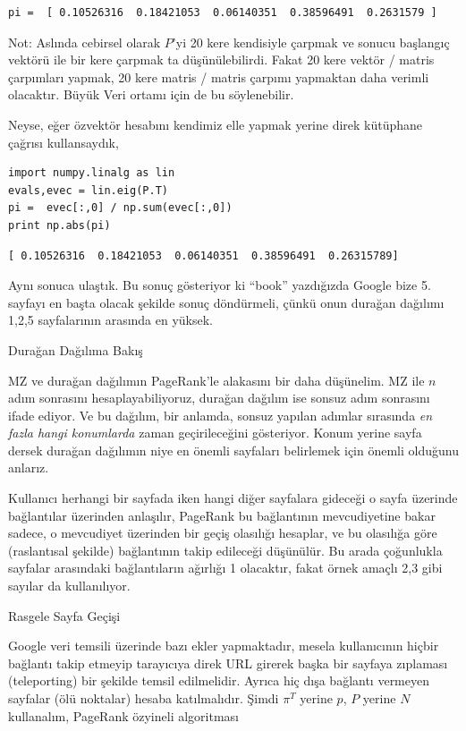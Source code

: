 \documentclass[12pt,fleqn]{article}\usepackage{../../common}
\begin{document}
\begin{verbatim}
pi =  [ 0.10526316  0.18421053  0.06140351  0.38596491  0.2631579 ]
\end{verbatim}

Not: Aslında cebirsel olarak $P$'yi 20 kere kendisiyle çarpmak ve sonucu
başlangıç vektörü ile bir kere çarpmak ta düşünülebilirdi. Fakat 20 kere
vektör / matris çarpımları yapmak, 20 kere matris / matris çarpımı
yapmaktan daha verimli olacaktır. Büyük Veri ortamı için de bu söylenebilir.

Neyse, eğer özvektör hesabını kendimiz elle yapmak yerine direk kütüphane
çağrısı kullansaydık,

\begin{verbatim}
import numpy.linalg as lin
evals,evec = lin.eig(P.T)
pi =  evec[:,0] / np.sum(evec[:,0])
print np.abs(pi)
\end{verbatim}

\begin{verbatim}
[ 0.10526316  0.18421053  0.06140351  0.38596491  0.26315789]
\end{verbatim}

Aynı sonuca ulaştık. Bu sonuç gösteriyor ki ``book'' yazdığızda Google bize
5. sayfayı en başta olacak şekilde sonuç döndürmeli, çünkü onun durağan
dağılımı 1,2,5 sayfalarının arasında en yüksek.

Durağan Dağılıma Bakış

MZ ve durağan dağılımın PageRank'le alakasını bir daha düşünelim. MZ ile
$n$ adım sonrasını hesaplayabiliyoruz, durağan dağılım ise sonsuz adım
sonrasını ifade ediyor. Ve bu dağılım, bir anlamda, sonsuz yapılan adımlar
sırasında {\em en fazla hangi konumlarda} zaman geçirileceğini
gösteriyor. Konum yerine sayfa dersek durağan dağılımın niye en önemli
sayfaları belirlemek için önemli olduğunu anlarız. 

Kullanıcı herhangi bir sayfada iken hangi diğer sayfalara gideceği o sayfa
üzerinde bağlantılar üzerinden anlaşılır, PageRank bu bağlantının
mevcudiyetine bakar sadece, o mevcudiyet üzerinden bir geçiş olasılığı
hesaplar, ve bu olasılığa göre (raslantısal şekilde) bağlantının takip
edileceği düşünülür. Bu arada çoğunlukla sayfalar arasındaki bağlantıların
ağırlığı 1 olacaktır, fakat örnek amaçlı 2,3 gibi sayılar da kullanılıyor. 

Rasgele Sayfa Geçişi

Google veri temsili üzerinde bazı ekler yapmaktadır, mesela kullanıcının
hiçbir bağlantı takip etmeyip tarayıcıya direk URL girerek başka bir
sayfaya zıplaması (teleporting) bir şekilde temsil edilmelidir. Ayrıca hiç
dışa bağlantı vermeyen sayfalar (ölü noktalar) hesaba katılmalıdır. Şimdi
$\pi^T$ yerine $p$, $P$ yerine $N$ kullanalım, PageRank özyineli
algoritması
\end{document}
